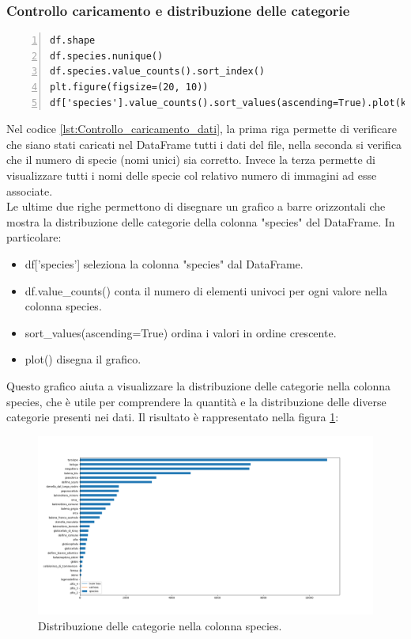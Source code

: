 \documentclass[a4paper,final,12pt]{report}
\begin{document}
\subsubsection{Controllo caricamento e distribuzione delle categorie}
\begin{lstlisting}[caption={Controllo del corretto caricamento dei dati.}, label={lst:Controllo_caricamento_dati}, breaklines, escapechar=`\%, frame=lines, basicstyle=\small\ttfamily, keepspaces=true, numbers=left]
df.shape
df.species.nunique()
df.species.value_counts().sort_index()
plt.figure(figsize=(20, 10))
df['species'].value_counts().sort_values(ascending=True).plot(kind='barh');
\end{lstlisting}
Nel codice \ref{lst:Controllo_caricamento_dati}, la prima riga permette di verificare che siano stati caricati nel DataFrame tutti i dati del file, nella seconda si verifica che il numero di specie (nomi unici) sia corretto. Invece la terza permette di visualizzare tutti i nomi delle specie col relativo numero di immagini ad esse associate.\\
Le ultime due righe permettono di disegnare un grafico a barre orizzontali che mostra la distribuzione delle categorie della colonna "species" del DataFrame. In particolare:
\begin{itemize}
    \item df['species'] seleziona la colonna "species" dal DataFrame.
    \item df.value\_counts() conta il numero di elementi univoci per ogni valore nella colonna species.
    \item sort\_values(ascending=True) ordina i valori in ordine crescente.
    \item plot() disegna il grafico.
\end{itemize}
Questo grafico aiuta a visualizzare la distribuzione delle categorie nella colonna species, che è utile per comprendere la quantità e la distribuzione delle diverse categorie presenti nei dati. Il risultato è rappresentato nella figura \ref{figura:distribuzione}:
\begin{figure}[hbtp]
\centering
\includegraphics[scale=0.26]{img_concettuale/numEsemp.png}
\caption{Distribuzione delle categorie nella colonna species.}
\label{figura:distribuzione}
\end{figure}
\end{document}
